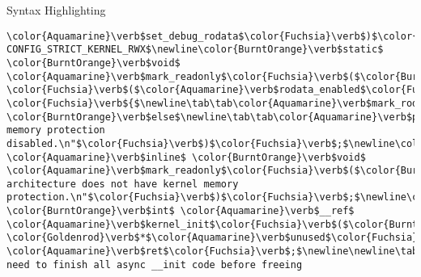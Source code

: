 \begin{frame}{Syntax Highlighting}
\begin{verbatim}
\color{Aquamarine}\verb$set_debug_rodata$\color{Fuchsia}\verb$)$\color{Fuchsia}\verb$;$\newline\color{Gray}\verb$#endif$\newline\newline\color{Gray}\verb$#ifdef CONFIG_STRICT_KERNEL_RWX$\newline\color{BurntOrange}\verb$static$ \color{BurntOrange}\verb$void$ \color{Aquamarine}\verb$mark_readonly$\color{Fuchsia}\verb$($\color{BurntOrange}\verb$void$\color{Fuchsia}\verb$)$\newline\color{Fuchsia}\verb${$\newline\tab\color{BurntOrange}\verb$if$ \color{Fuchsia}\verb$($\color{Aquamarine}\verb$rodata_enabled$\color{Fuchsia}\verb$)$ \color{Fuchsia}\verb${$\newline\tab\tab\color{Aquamarine}\verb$mark_rodata_ro$\color{Fuchsia}\verb$($\color{Fuchsia}\verb$)$\color{Fuchsia}\verb$;$\newline\tab\tab\color{Aquamarine}\verb$rodata_test$\color{Fuchsia}\verb$($\color{Fuchsia}\verb$)$\color{Fuchsia}\verb$;$\newline\tab\color{Fuchsia}\verb$}$ \color{BurntOrange}\verb$else$\newline\tab\tab\color{Aquamarine}\verb$pr_info$\color{Fuchsia}\verb$($\color{Emerald}\verb$"Kernel memory protection disabled.\n"$\color{Fuchsia}\verb$)$\color{Fuchsia}\verb$;$\newline\color{Fuchsia}\verb$}$\newline\color{Gray}\verb$#else$\newline\color{BurntOrange}\verb$static$ \color{Aquamarine}\verb$inline$ \color{BurntOrange}\verb$void$ \color{Aquamarine}\verb$mark_readonly$\color{Fuchsia}\verb$($\color{BurntOrange}\verb$void$\color{Fuchsia}\verb$)$\newline\color{Fuchsia}\verb${$\newline\tab\color{Aquamarine}\verb$pr_warn$\color{Fuchsia}\verb$($\color{Emerald}\verb$"This architecture does not have kernel memory protection.\n"$\color{Fuchsia}\verb$)$\color{Fuchsia}\verb$;$\newline\color{Fuchsia}\verb$}$\newline\color{Gray}\verb$#endif$\newline\newline\color{BurntOrange}\verb$static$ \color{BurntOrange}\verb$int$ \color{Aquamarine}\verb$__ref$ \color{Aquamarine}\verb$kernel_init$\color{Fuchsia}\verb$($\color{BurntOrange}\verb$void$ \color{Goldenrod}\verb$*$\color{Aquamarine}\verb$unused$\color{Fuchsia}\verb$)$\newline\color{Fuchsia}\verb${$\newline\tab\color{BurntOrange}\verb$int$ \color{Aquamarine}\verb$ret$\color{Fuchsia}\verb$;$\newline\newline\tab\color{Aquamarine}\verb$kernel_init_freeable$\color{Fuchsia}\verb$($\color{Fuchsia}\verb$)$\color{Fuchsia}\verb$;$\newline\tab\color{Rhodamine}\begin{verbatim}/* need to finish all async __init code before freeing 
\end{verbatim}
\end{frame}
